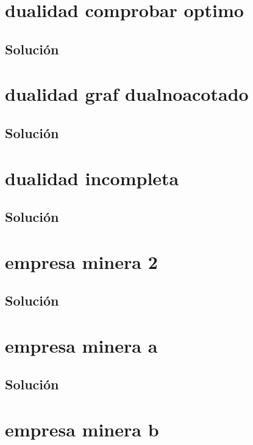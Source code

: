 \documentclass[a4paper,10pt,onecolumn]{report}
\begin{document}
\section{dualidad comprobar optimo}

\subsection*{Solución}

\clearpage
\section{dualidad graf dualnoacotado}

\subsection*{Solución}

\clearpage
\section{dualidad incompleta}

\subsection*{Solución}

\clearpage
\section{empresa minera 2}

\subsection*{Solución}

\clearpage
\section{empresa minera a}

\subsection*{Solución}

\clearpage
\section{empresa minera b}

\end{document}
